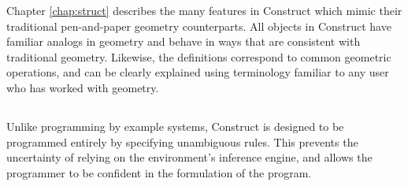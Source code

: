 \documentclass[twoside,openright,11pt]{report}
\begin{document}
Chapter \ref{chap:struct} describes the many features in Construct which mimic their traditional pen-and-paper geometry counterparts.
All objects in Construct have familiar analogs in geometry and behave in ways that are consistent with traditional geometry.
Likewise, the definitions correspond to common geometric operations, and can be clearly explained using terminology familiar to any user who has worked with geometry.

\subsection{\constructgoalsnoinfer}

Unlike programming by example systems, Construct is designed to be programmed entirely by specifying unambiguous rules.
This prevents the uncertainty of relying on the environment's inference engine, and allows the programmer to be confident in the formulation of the program.

\subsection{\constructgoalscomplete}

\appendix

\nocite{*}



\end{document}
